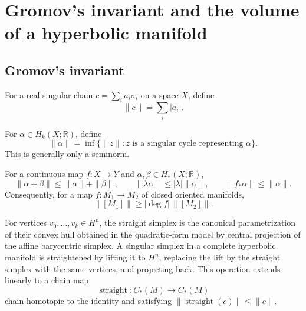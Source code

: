 \chapter{Gromov's invariant and the volume of a hyperbolic manifold}

\section{Gromov's invariant}

\begin{definition}
\label{thurston-ch06-singular-chain-norm}

For a real singular chain $c=\sum_i a_i\sigma_i$ on a space $X$, define
\[
\|c\|=\sum_i|a_i|.
\]
\end{definition}

\begin{definition}
\label{thurston-ch06-gromov-norm}

For $\alpha\in H_k(X;\mathbb R)$, define
\[
\|\alpha\|=\inf\{\|z\|:z\text{ is a singular cycle representing }\alpha\}.
\]
This is generally only a seminorm.
\end{definition}

\begin{proposition}
\label{thurston-ch06-gromov-norm-functoriality}

For a continuous map $f:X\to Y$ and $\alpha,\beta\in H_*(X;\mathbb R)$,
\[
\|\alpha+\beta\|\leq\|\alpha\|+\|\beta\|,\qquad
\|\lambda\alpha\|\leq|\lambda|\|\alpha\|,\qquad
\|f_*\alpha\|\leq\|\alpha\|.
\]
Consequently, for a map $f:M_1\to M_2$ of closed oriented manifolds,
\[
\|[M_1]\|\geq|\deg f|\,\|[M_2]\|.
\]
\end{proposition}

\begin{definition}
\label{thurston-ch06-hyperbolic-straightening}

For vertices $v_0,\ldots,v_k\in H^n$, the straight simplex is the canonical parametrization of their convex hull obtained in the quadratic-form model by central projection of the affine barycentric simplex. A singular simplex in a complete hyperbolic manifold is straightened by lifting it to $H^n$, replacing the lift by the straight simplex with the same vertices, and projecting back. This operation extends linearly to a chain map
\[
\operatorname{straight}:C_*(M)\to C_*(M)
\]
chain-homotopic to the identity and satisfying $\|\operatorname{straight}(c)\|\leq\|c\|$.
\end{definition}

